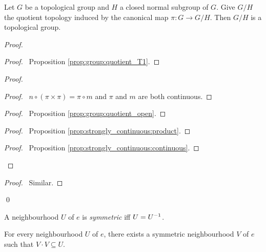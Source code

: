 \begin{prop}
  Let $G$ be a topological group and $H$ a closed normal subgroup of $G$.
  Give $G / H$ the quotient topology induced by the canonical map $\pi : G \rightarrow G / H$. Then $G / H$ is a topological group.
\end{prop}

\begin{proof}
  \pf
  \begin{proof}
    \pf\ Proposition \ref{prop:group:quotient_T1}.
  \end{proof}
  \begin{proof}
    \begin{proof}
      \pf\ $n \circ (\pi \times \pi) = \pi \circ m$ and $\pi$ and $m$ are both continuous.
    \end{proof}
    \begin{proof}
      \pf\ Proposition \ref{prop:group:quotient_open}.
    \end{proof}
    \begin{proof}
      \pf\ Proposition \ref{prop:strongly_continuous:product}.
    \end{proof}
    \begin{proof}
      \pf\ Proposition \ref{prop:strongly_continuous:continuous}.
    \end{proof}
  \end{proof}
  \begin{proof}
    \pf\ Similar.
  \end{proof}
  \qed
\end{proof}

\begin{df}
  A neighbourhood $U$ of $e$ is \emph{symmetric} iff $U = {U}^{-1}$.
\end{df}

\begin{prop}
  \label{prop:group:symmetric_neighbourhood}
  For every neighbourhood $U$ of $e$, there exists a symmetric neighbourhood $V$ of $e$ such that $V \cdot V \subseteq U$.
\end{prop}

